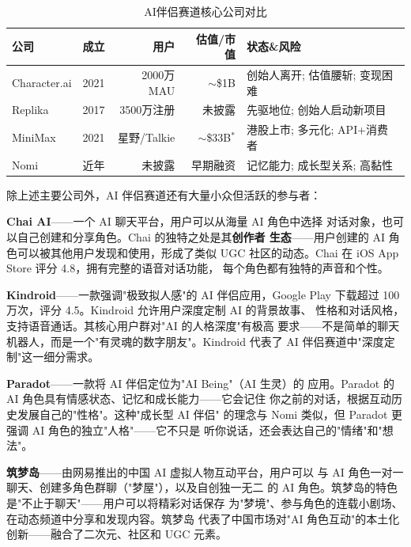 \begin{table}[htbp]
\centering
\caption{AI伴侣赛道核心公司对比}
\label{tab:ai-companion-comparison}
\small
\begin{tabularx}{\textwidth}{l c r r X}
\toprule
\rowcolor{figLightGray}
\textbf{公司} & \textbf{成立} & \textbf{用户}
  & \textbf{估值/市值} & \textbf{状态\&风险} \\
\midrule
Character.ai & 2021 & 2000万MAU
  & $\sim$\$1B & 创始人离开; 估值腰斩; 变现困难 \\
Replika      & 2017 & 3500万注册
  & 未披露 & 先驱地位; 创始人启动新项目 \\
MiniMax      & 2021 & 星野/Talkie
  & $\sim$\$33B$^*$ & 港股上市; 多元化; API+消费者 \\
Nomi         & 近年 & 未披露
  & 早期融资 & 记忆能力; 成长型关系; 高黏性 \\
\bottomrule
\end{tabularx}

\medskip
{}
\end{table}

除上述主要公司外，AI 伴侣赛道还有大量小众但活跃的参与者：

\textbf{Chai AI}——一个 AI 聊天平台，用户可以从海量 AI 角色中选择
对话对象，也可以自己创建和分享角色。Chai 的独特之处是其\textbf{创作者
生态}——用户创建的 AI 角色可以被其他用户发现和使用，形成了类似 UGC
社区的动态。Chai 在 iOS App Store 评分 4.8，拥有完整的语音对话功能，
每个角色都有独特的声音和个性。

\textbf{Kindroid}——一款强调"极致拟人感"的 AI 伴侣应用，Google Play
下载超过 100 万次，评分 4.5。Kindroid 允许用户深度定制 AI 的背景故事、
性格和对话风格，支持语音通话。其核心用户群对"AI 的人格深度"有极高
要求——不是简单的聊天机器人，而是一个"有灵魂的数字朋友"。Kindroid
代表了 AI 伴侣赛道中"深度定制"这一细分需求。

\textbf{Paradot}——一款将 AI 伴侣定位为"AI Being"（AI 生灵）的
应用。Paradot 的 AI 角色具有情感状态、记忆和成长能力——它会记住
你之前的对话，根据互动历史发展自己的"性格"。这种"成长型 AI 伴侣"
的理念与 Nomi 类似，但 Paradot 更强调 AI 角色的独立"人格"——它不只是
听你说话，还会表达自己的"情绪"和"想法"。

\textbf{筑梦岛}——由网易推出的中国 AI 虚拟人物互动平台，用户可以
与 AI 角色一对一聊天、创建多角色群聊（"梦屋"），以及自创独一无二
的 AI 角色。筑梦岛的特色是"不止于聊天"——用户可以将精彩对话保存
为"梦境"、参与角色的连载小剧场、在动态频道中分享和发现内容。筑梦岛
代表了中国市场对"AI 角色互动"的本土化创新——融合了二次元、社区和
UGC 元素。


